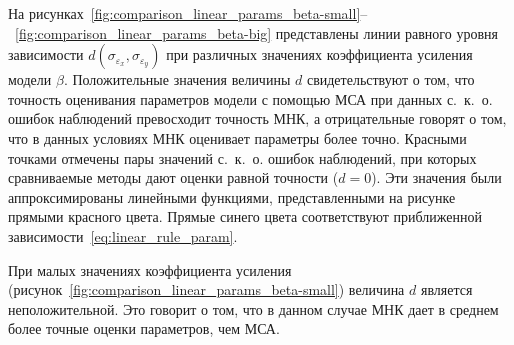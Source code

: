 На рисунках~\ref{fig:comparison_linear_params_beta-small}--~\ref{fig:comparison_linear_params_beta-big}
представлены линии равного уровня зависимости \( d(\sigma_{\varepsilon_x}, \sigma_{\varepsilon_y}) \)
при различных значениях коэффициента усиления модели \( \beta \).
Положительные значения величины \( d \) свидетельствуют о том,
что точность оценивания параметров модели с помощью МСА при данных с.~к.~о.
ошибок наблюдений превосходит точность МНК,
а отрицательные говорят о том, что в данных условиях МНК оценивает параметры более точно.
Красными точками отмечены пары значений с.~к.~о. ошибок наблюдений,
при которых сравниваемые методы дают оценки равной точности (\( d = 0 \)).
Эти значения были аппроксимированы линейными функциями,
представленными на рисунке прямыми красного цвета.
Прямые синего цвета соответствуют приближенной зависимости~\eqref{eq:linear_rule_param}.

При малых значениях коэффициента усиления
(рисунок~\ref{fig:comparison_linear_params_beta-small})
величина \( d \) является неположительной.
Это говорит о том, что в данном случае МНК дает в среднем более точные оценки параметров, чем МСА.

